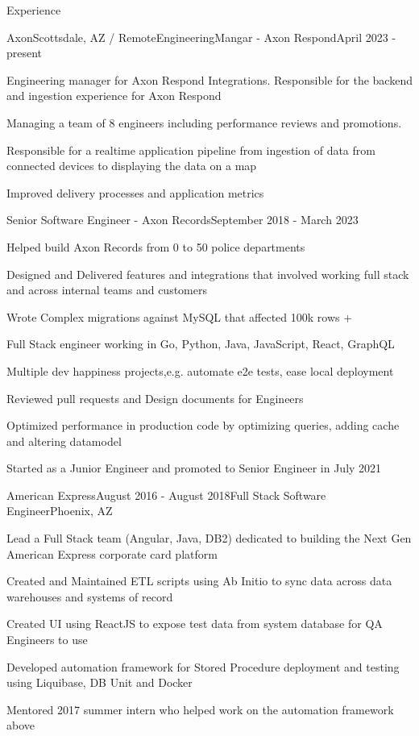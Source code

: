 \documentclass{resume} %
\begin{document}
\begin{rSection}{Experience}

\begin{rSubsection}{Axon}{Scottsdale, AZ / Remote}{EngineeringMangar - Axon Respond}{April 2023 - present}
\item Engineering manager for Axon Respond Integrations. Responsible for the backend and ingestion experience for Axon Respond
\item Managing a team of 8 engineers including performance reviews and promotions.
\item Responsible for a realtime application pipeline from ingestion of data from connected devices to displaying the data on a map
\item Improved delivery processes and application metrics

\end{rSubsection}

\begin{rSubsection}{}{}{Senior Software Engineer - Axon Records}{September 2018 - March 2023}
\item Helped build Axon Records from 0 to 50 police departments
\item Designed and Delivered features and integrations that involved working full stack and across internal teams and customers
\item Wrote Complex migrations against MySQL that affected 100k rows + 
\item Full Stack engineer working in Go, Python, Java, JavaScript, React, GraphQL
\item Multiple dev happiness projects,e.g. automate e2e tests, ease local deployment
\item Reviewed pull requests and Design documents for Engineers
\item Optimized performance in production code by optimizing queries, adding cache and altering datamodel
\item Started as a Junior Engineer and promoted to Senior Engineer in July 2021

\end{rSubsection}

\begin{rSubsection}{American Express}{August 2016 - August 2018}{Full Stack Software Engineer}{Phoenix, AZ}
\item Lead a Full Stack team (Angular, Java, DB2) dedicated to building the Next Gen American Express corporate card platform
\item Created and Maintained ETL scripts using Ab Initio to sync data across data warehouses and systems of record
\item Created UI using ReactJS to expose test data from system database for QA Engineers to use
\item Developed automation framework for Stored Procedure deployment and testing using Liquibase, DB Unit and Docker
\item Mentored 2017 summer intern who helped work on the automation framework above


\end{rSubsection}
\end{rSection}
\end{document}
